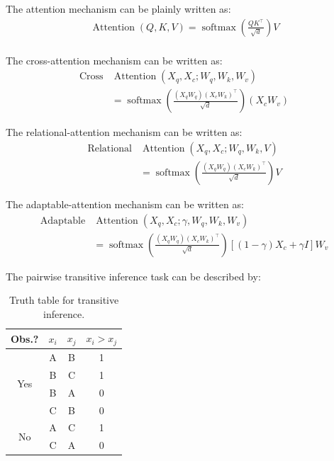 \documentclass[12pt]{article}
\begin{document}
The attention mechanism can be plainly written as:
\begin{gather*} 
\operatorname{Attention}(Q, K, V)=\operatorname{softmax}\!\left(\frac{QK^\top}{\sqrt{d}}\right) V\\
\end{gather*}

The cross-attention mechanism can be written as:
\begin{align*} 
\operatorname{Cross}&\operatorname{Attention}(X_q, X_c; W_q, W_k, W_v) \\
&= \operatorname{softmax}\!\left(\frac{(X_qW_q)(X_cW_k)^\top}{\sqrt{d}}\right)(X_cW_v)
\end{align*}

The relational-attention mechanism can be written as:
\begin{align*} 
\operatorname{Relational}&\operatorname{Attention}(X_q, X_c; W_q, W_k, V) \\
&= \operatorname{softmax}\!\left(\frac{(X_qW_q)(X_cW_k)^\top}{\sqrt{d}}\right)V
\end{align*}

The adaptable-attention mechanism can be written as:
\begin{align*} 
\operatorname{Adaptable}&\operatorname{Attention}(X_q, X_c; \gamma, W_q, W_k, W_v) \\
&= \operatorname{softmax}\!\left(\frac{(X_qW_q)(X_cW_k)^\top}{\sqrt{d}}\right)\left[(1-\gamma)X_c+\gamma I\right]W_v
\end{align*}

The pairwise transitive inference task can be described by:
\begin{table}[h]
\centering
\begin{tabular}{c c c | c}
\hline
Obs.? & $x_i$ & $x_j$ & $x_i > x_j$ \\
\hline
\multirow{4}{*}{Yes} 
  & A & B & 1 \\
  & B & C & 1 \\
  & B & A & 0 \\
  & C & B & 0 \\
\hline
\multirow{2}{*}{No} 
  & A & C & 1 \\
  & C & A & 0 \\
\hline
\end{tabular}
\caption{Truth table for transitive inference.}
\end{table}

\end{document}
